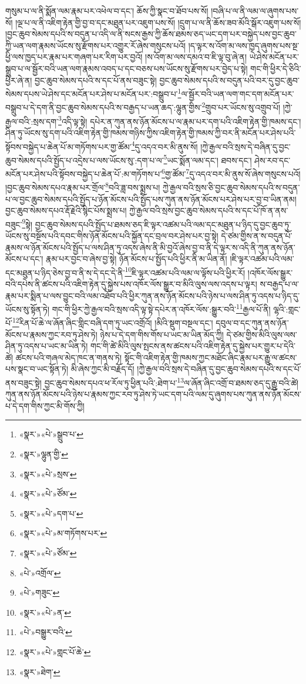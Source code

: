 གསུམ་པ་ལ་ནི་སྨོན་ལམ་རྣམ་པར་འཕེལ་བ་དང་། ཆོས་ཀྱི་སྣང་བ་ཐོབ་པས་སོ། །བཞི་པ་ལ་ནི་ལམ་ལ་ཞུགས་པས་སོ། །ལྔ་པ་ལ་ནི་འཇིག་རྟེན་གྱི་བྱ་བ་དང་མཐུན་པར་འཇུག་པས་སོ། །དྲུག་པ་ལ་ནི་ཆོས་ཟབ་མོའི་སྒོར་འཇུག་པས་སོ། །བྱང་ཆུབ་སེམས་དཔའི་ས་བདུན་པ་འདི་ལ་ནི་སངས་རྒྱས་ཀྱི་ཆོས་ཐམས་ཅད་ཡང་དག་པར་བསྐྱེད་པས་བྱང་ཆུབ་ཀྱི་ཡན་ལག་རྣམས་ཡོངས་སུ་རྫོགས་པར་འགྱུར་རོ་ཞེས་གསུངས་པའོ། །ད་ལྟར་ས་འོག་མ་ལས་ཁྱད་ཞུགས་པས་སྔ་ཕྱི་ལས་ཁྱད་པར་རྣམ་པར་གཞག་པར་རིག་པར་བྱའོ། །ས་འོག་མ་ལས་དམའ་བ་ཇི་ལྟ་བུ་ཞེ་ན། ཡེ་ཤེས་མངོན་པར་སྒྲུབ་པ་ལ་སྦྱོར་བའི་ཡན་ལག་རྣམས་འབད་པ་དང་བཅས་པས་ཡོངས་སུ་རྫོགས་པར་བྱེད་པ་སྟེ། གང་གི་ཕྱིར་དེ་ཅིའི་ཕྱིར་ཞེ་ན། བྱང་ཆུབ་སེམས་དཔའི་ས་དང་པོ་ནས་བཟུང་སྟེ། བྱང་ཆུབ་སེམས་དཔའི་ས་བདུན་པའི་བར་དུ་བྱང་ཆུབ་སེམས་དཔས་ཡེ་ཤེས་དང་མངོན་པར་ཤེས་པ་མངོན་པར་:བསྒྲུབ་པ་\footnote{«སྣར་»«པེ་»སྒྲུབ་པ་}ལ་སྦྱོར་བའི་ཡན་ལག་གང་དག་མངོན་པར་བསྒྲུབ་པ་དེ་དག་ནི་བྱང་ཆུབ་སེམས་དཔའི་ས་བརྒྱད་པ་ཡན་ཆད་:ལྷུན་གྱིས་\footnote{«སྣར་»ལྷུན་གྱི་}གྲུབ་པར་ཡོངས་སུ་འགྲུབ་པོ། །ཀྱེ་རྒྱལ་བའི་:སྲས་དག་\footnote{«སྣར་»«པེ་»སྲས་}འདི་ལྟ་སྟེ། དཔེར་ན་ཀུན་ནས་ཉོན་མོངས་པ་ལ་རྣམ་པར་དག་པའི་འཇིག་རྟེན་གྱི་ཁམས་དང་། ཤིན་ཏུ་ཡོངས་སུ་དག་པའི་འཇིག་རྟེན་གྱི་ཁམས་གཉིས་ཀྱིས་འཇིག་རྟེན་གྱི་ཁམས་ཀྱི་བར་ནི་མངོན་པར་ཤེས་པའི་སྟོབས་བསྐྱེད་པ་ཆེན་པོ་མ་གཏོགས་པར་གྱ་ཚོམ་\footnote{«སྣར་»«པེ་»ཙོམ་}དུ་འདའ་བར་མི་ནུས་སོ། །ཀྱེ་རྒྱལ་བའི་སྲས་དེ་བཞིན་དུ་བྱང་ཆུབ་སེམས་དཔའི་སྤྱོད་པ་འདྲེས་པ་ལས་ཡོངས་སུ་:དག་པ་ལ་\footnote{«སྣར་»«པེ་»དག་པ་}ཡང་སྨོན་ལམ་དང་། ཐབས་དང་། ཤེས་རབ་དང་མངོན་པར་ཤེས་པའི་སྟོབས་བསྐྱེད་པ་ཆེན་པོ་:མ་གཏོགས་པ་\footnote{«སྣར་»«པེ་»མ་གཏོགས་པར་}གྱ་ཚོམ་\footnote{«སྣར་»«པེ་»ཙོམ་}དུ་འདའ་བར་མི་ནུས་སོ་ཞེས་གསུངས་པའོ། །བྱང་ཆུབ་སེམས་དཔའ་རྣམ་པར་གྲོལ་\footnote{«པེ་»འགྲོལ་}བའི་ཟླ་བས་སྨྲས་པ། ཀྱེ་རྒྱལ་བའི་སྲས་ཅི་བྱང་ཆུབ་སེམས་དཔའི་ས་བདུན་པ་ལ་བྱང་ཆུབ་སེམས་དཔའི་སྤྱོད་པ་ཉོན་མོངས་པའི་སྤྱོད་པས་ཀུན་ནས་ཉོན་མོངས་པར་ཤེས་པར་བྱ་བ་ཡིན་ནམ། བྱང་ཆུབ་སེམས་དཔའ་རྡོ་རྗེའི་སྙིང་པོས་སྨྲས་པ། ཀྱེ་རྒྱལ་བའི་སྲས་བྱང་ཆུབ་སེམས་དཔའི་ས་དང་པོ་ཁོ་ན་ནས་བཟུང་\footnote{«པེ་»གཟུང་}སྟེ། བྱང་ཆུབ་སེམས་དཔའི་སྤྱོད་པ་ཐམས་ཅད་ཇི་ལྟར་འཚམ་པའི་ལམ་དང་མཐུན་པ་ཉིད་དུ་བྱང་ཆུབ་ཏུ་ཡོངས་སུ་བསྔོས་པའི་དབང་གིས་ཉོན་མོངས་པའི་སྐྱོན་དང་བྲལ་བར་ཤེས་པར་བྱ་སྟེ། དེ་ཙམ་གྱིས་ན་ས་བདུན་པོ་རྣམས་ལ་ཉོན་མོངས་པའི་སྤྱོད་པ་ལས་ཤིན་ཏུ་འདས་ཞེས་ནི་མི་བྱའོ་ཞེས་བྱ་བ་ནི་དེ་ལྟར་ས་འདི་ནི་ཀུན་ནས་ཉོན་མོངས་པ་དང་། རྣམ་པར་བྱང་བ་ཞེས་བྱ་སྟེ། ཉོན་མོངས་པ་སྤྱོད་པའི་ཕྱིར་ནི་མ་ཡིན་ནོ། །ཇི་ལྟར་འཚམ་པའི་ལམ་དང་མཐུན་པ་ཉིད་ཅེས་བྱ་བ་ནི་ས་དེ་དང་དེ་ནི་\footnote{«སྣར་»«པེ་»ན་}ཇི་ལྟར་འཚམ་པའི་ལམ་ལ་ལྟོས་པའི་ཕྱིར་རོ། །འཁོར་ལོས་སྒྱུར་བའི་དཔེས་ནི་ཚངས་པའི་འཇིག་རྟེན་དུ་སྐྱེས་པས་འཁོར་ལོས་སྒྱུར་བ་མིའི་ལུས་ལས་འདས་པ་ལྟར། ས་བརྒྱད་པ་ལ་རྣམ་པར་སྨིན་པ་ལས་བྱུང་བའི་ལམ་འཐོབ་པའི་ཕྱིར་ཀུན་ནས་ཉོན་མོངས་པའི་ཉེས་པ་ལས་ཤིན་ཏུ་འདས་པ་ཉིད་དུ་ཡོངས་སུ་སྟོན་ཏེ། གང་གི་ཕྱིར་ཀྱེ་རྒྱལ་བའི་སྲས་འདི་ལྟ་སྟེ་དཔེར་ན་འཁོར་ལོས་:སྒྱུར་བའི་\footnote{«པེ་»བསྒྱུར་བའི་}རྒྱལ་པོ་ནི། ལྷའི་:གླང་པོ་\footnote{«སྣར་»«པེ་»གླང་པོ་ཆེ་}རིན་པོ་ཆེ་ལ་ཞོན་ཞིང་གླིང་བཞི་དག་ཏུ་ཡང་འགྲོའོ། །མིའི་སྡུག་བསྔལ་དང་། དབུལ་བ་དང་ཀུན་ནས་ཉོན་མོངས་པ་རྣམས་ཀྱང་རབ་ཏུ་ཤེས་ཏེ། ཉེས་པ་དེ་དག་གིས་གོས་པ་ཡང་མ་ཡིན་མོད་ཀྱི། དེ་ཙམ་གྱིས་མིའི་ལུས་ལས་ཤིན་ཏུ་འདས་པ་ཡང་མ་ཡིན་ཏེ། གང་གི་ཚེ་མིའི་ལུས་སྤངས་ནས་ཚངས་པའི་འཇིག་རྟེན་དུ་སྐྱེས་པར་གྱུར་པ་དེའི་ཚེ། ཚངས་པའི་གཞལ་མེད་ཁང་ན་གནས་ཏེ། སྟོང་གི་འཇིག་རྟེན་གྱི་ཁམས་ཀྱང་མཐོང་ཞིང་རྣམ་པར་རྒྱུ་ལ་ཚངས་པས་སྣང་བ་ཡང་སྟོན་ཏེ། མི་ཞེས་ཀྱང་མི་བརྗོད་དོ། །ཀྱེ་རྒྱལ་བའི་སྲས་དེ་བཞིན་དུ་བྱང་ཆུབ་སེམས་དཔའི་ས་དང་པོ་ནས་བཟུང་སྟེ། བྱང་ཆུབ་སེམས་དཔའ་ཕ་རོལ་ཏུ་ཕྱིན་པའི་:ཐེག་པ་\footnote{«སྣར་»ཐེག་}ལ་ཞོན་ཞིང་འགྲོ་བ་ཐམས་ཅད་དུ་རྒྱུ་བའི་ཚེ། ཀུན་ནས་ཉོན་མོངས་པའི་ཉེས་པ་རྣམས་ཀྱང་རབ་ཏུ་ཤེས་ཏེ་ཡང་དག་པའི་ལམ་དུ་ཞུགས་པས་ཀུན་ནས་ཉོན་མོངས་པ་དེ་དག་གིས་ཀྱང་མི་གོས་ཀྱི། 